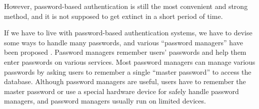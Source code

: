 \documentclass{sigchi}
\begin{document}
However,
password-based authentication is still the most
convenient and strong method\cite{Bonnearu:ReplacePasswords},
and it is not supposed to get extinct
in a short period of time\cite{Herley:2009:PSS:1601990.1602010}.



If we have to live with password-based authentication systems,
we have to devise some ways to handle many passwords, and
various ``password managers'' have been proposed
\cite{OnePassword}%
\cite{Dashlane}%
\cite{ミルパス}%
\cite{LastPass}%
\cite{KeyPass}%
\cite{NortonIDSafe}%
\cite{IDManager}.
%
Password managers remember users' passwords and help them enter
passwords on various services.
%
%
Most password managers can manage various passwords by
asking users to remember a single ``master password'' to access the database.
%
%
Although password managers are useful,
users have to remember the master password
or use a special hardware device
for safely handle password managers, and
password managers usually run on limited devices.

%
\end{document}

